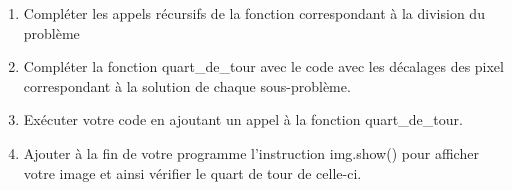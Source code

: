\documentclass[11pt,a4paper]{article}
\newcounter{num}
\begin{document}
\begin{enumerate}
\begin{enumerate}


\item Compléter les appels récursifs de la fonction correspondant à la division du problème

\item Compléter la fonction \textsf{quart\_de\_tour} avec le code avec les décalages des pixel correspondant à la solution de chaque sous-problème.

\item Exécuter votre code en ajoutant un appel à la fonction \textsf{quart\_de\_tour}.

\item Ajouter à la fin de votre programme l'instruction \textsf{img.show()} pour afficher votre image et ainsi vérifier le quart de tour de celle-ci.

\end{enumerate}




\end{enumerate}
\end{document}
